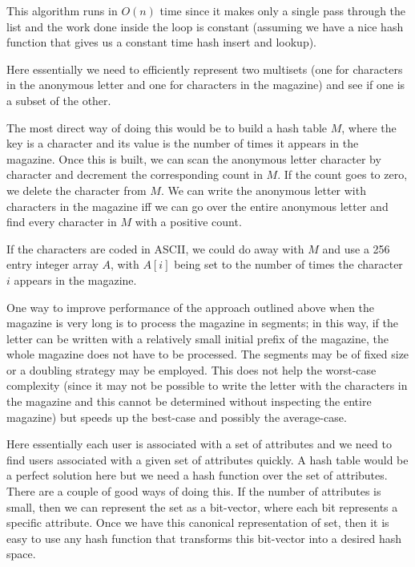 This algorithm runs in $O(n)$ time since it makes only a single pass through the list 
and the work done inside the loop is constant (assuming we have 
a nice hash function that gives us a constant time hash insert and lookup).


Here essentially we need to efficiently represent two multisets (one
for characters in the anonymous letter and one for characters in the
magazine) and see if one is a subset of the other.

The most direct way of doing this would be to build a hash table $M$, where
the key is a character and its value is the number of times it appears
in the magazine.  Once this is built, we can scan the anonymous letter 
character by character and decrement the corresponding count in $M$.
If the count goes to zero, we delete the character from $M$.
We can write the anonymous letter with characters in the magazine
iff we can go over the entire anonymous letter and find every
character in $M$ with a positive count. 

If the characters are coded in ASCII, we could do away with $M$ and use a 256 entry 
integer array $A$, with $A[i]$ being set to the number of times the character $i$ appears
in the magazine.

One way to improve performance of the approach outlined above
when the magazine is very long is to process the magazine in segments;
in this way, if the letter can be written with a relatively
small initial prefix of the magazine, the whole magazine does not have
to be processed. 
The segments may be of fixed size or a doubling strategy may be employed.
This does not help the worst-case complexity (since
it may not be possible to write the letter with the characters in the magazine
and this cannot be determined without inspecting the entire magazine) but
speeds up the best-case and possibly the average-case.

Here essentially each user is associated with a set of attributes and
we need to find users associated with a given set of attributes
quickly. A hash table would be a perfect solution here but we need
a hash function over the set of attributes.  There are a couple of
good ways of doing this. If the number of attributes is small, then we
can represent the set as a bit-vector, where each bit represents a
specific attribute. Once we have this canonical representation of set,
then it is easy to use any hash function that transforms this bit-vector into a desired hash space. 

